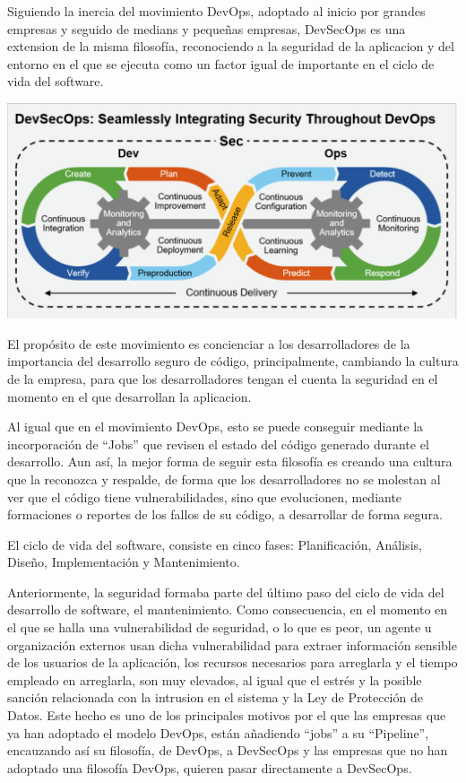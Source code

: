 \documentclass[12pt]{report} %
\begin{document}
Siguiendo la inercia del movimiento DevOps, adoptado al inicio por grandes empresas y seguido de medians y pequeñas empresas, DevSecOps es una extension de la misma filosofía, reconociendo a la seguridad de la aplicacion y del entorno en el que se ejecuta como un factor igual de importante en el ciclo de vida del software.

\includegraphics[width=\textwidth]{devsecops.png}

El propósito de este movimiento es concienciar a los desarrolladores de la importancia del desarrollo seguro de código, principalmente, cambiando la cultura de la empresa, para que los desarrolladores tengan el cuenta la seguridad en el momento en el que desarrollan la aplicacion.

Al igual que en el movimiento DevOps, esto se puede conseguir mediante la incorporación de ``Jobs'' que revisen el estado del código generado durante el desarrollo.
Aun así, la mejor forma de seguir esta filosofía es creando una cultura que la reconozca y respalde, de forma que los desarrolladores no se molestan al ver que el código tiene vulnerabilidades, sino que evolucionen, mediante formaciones o reportes de los fallos de su código, a desarrollar de forma segura.

El ciclo de vida del software, consiste en cinco fases: Planificación, Análisis, Diseño, Implementación y Mantenimiento.


Anteriormente, la seguridad formaba parte del último paso del ciclo de vida del desarrollo de software, el mantenimiento.
Como consecuencia, en el momento en el que se halla una vulnerabilidad de seguridad, o lo que es peor, un agente u organización externos usan dicha vulnerabilidad para extraer información sensible de los usuarios de la aplicación, los recursos necesarios para arreglarla y el tiempo empleado en arreglarla, son muy elevados, al igual que el estrés y la posible sanción relacionada con la intrusion en el sistema y la Ley de Protección de Datos.
Este hecho es uno de los principales motivos por el que las empresas que ya han adoptado el modelo DevOps, están añadiendo ``jobs'' a su ``Pipeline'', encauzando así su filosofía, de DevOps, a DevSecOps y las empresas que no han adoptado una filosofía DevOps, quieren pasar directamente a DevSecOps.
\end{document}
